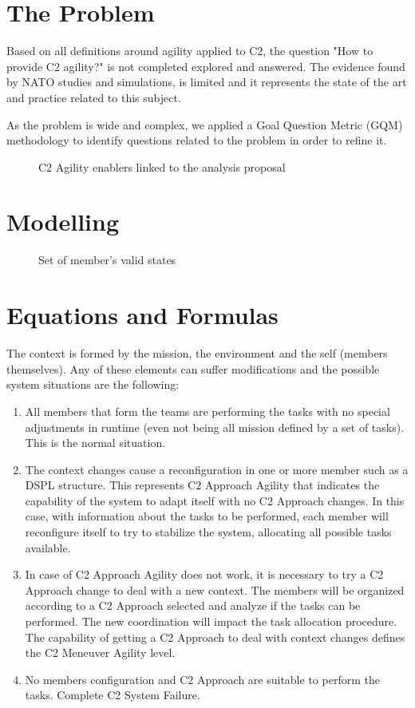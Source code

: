 \section {The Problem}
Based on all definitions around agility applied to C2, the question "How to provide C2 agility?" is not completed explored and answered. The evidence found by NATO studies and simulations, is limited and it represents the state of the art and practice related to this subject.

As the problem is wide and complex, we applied a Goal Question Metric (GQM) methodology to identify questions related to the problem in order to refine it. 


\begin{figure}[h]
\centering

\caption{C2 Agility enablers linked to the analysis proposal}
\end{figure}


\section{Modelling}
\label{sec:modelling}


\begin{figure}[h]
\centering

\caption{Set of member's valid states}
\end{figure}


\section{Equations and Formulas}

The context is formed by the mission, the environment and the self (members themselves). Any of these elements can suffer modifications and the possible system situations are the following:
\begin{enumerate}
    \item All members that form the teams are performing the tasks with no special adjustments in runtime (even not being all mission defined by a set of tasks). This is the normal situation.
    \item The context changes cause a reconfiguration in one or more member such as a DSPL structure. This represents C2 Approach Agility that indicates the capability of the system to adapt itself with no C2 Approach changes. In this case, with information about the tasks to be performed, each member will reconfigure itself to try to stabilize the system, allocating all possible tasks available.
    \item In case of C2 Approach Agility does not work, it is necessary to try a C2 Approach change to deal with a new context. The members will be organized according to a C2 Approach selected and analyze if the tasks can be performed. The new coordination will impact the task allocation procedure. The capability of getting a C2 Approach to deal with context changes defines the C2 Meneuver Agility level.
    \item No members configuration and C2 Approach are suitable to perform the tasks. Complete C2 System Failure.
\end{enumerate}

